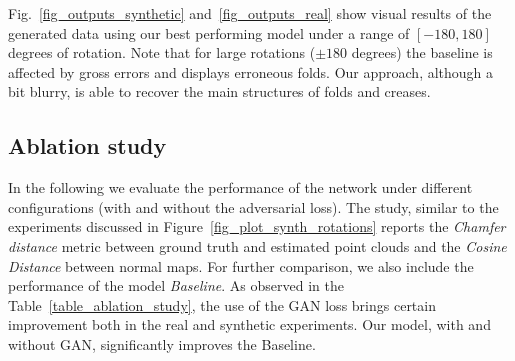 Fig.~\ref{fig_outputs_synthetic} and~\ref{fig_outputs_real} show visual results of the generated data using our best performing model under a range  of $[-180,180]$ degrees of rotation. Note that for large rotations ($\pm 180$ degrees) the baseline is affected by gross errors and displays erroneous folds. Our approach, although a bit blurry, is able to recover the main structures of folds and creases. 

\subsection{Ablation study}

In the following we    evaluate  the performance of the network under different configurations (with and without the adversarial loss). The study, similar to the experiments discussed in Figure~\ref{fig_plot_synth_rotations} reports the \textit{Chamfer distance} metric  between ground truth and estimated point clouds  and the \textit{Cosine Distance} between normal maps.  For further comparison, we also include the performance of the model {\em Baseline}. As observed in the Table~\ref{table_ablation_study}, the use of the GAN loss brings certain improvement both in the real and synthetic experiments. Our model, with and without GAN, significantly improves the Baseline.

\begin{table}[t!]
\begin{center}
\caption[Quantitative results under different network configurations]{{\bf Quantitative results under different network configurations.} The table shows the results in terms of \textit{Chamfer distance}   mean and standard deviation and the \textit{Cosine Distance}  between the normals maps for the Baseline and the model trained with and without the Adversarial loss. The evaluation has been done from -180 to 180 degrees of rotation.}
\label{table_ablation_study}
\end{center}
\end{table}


